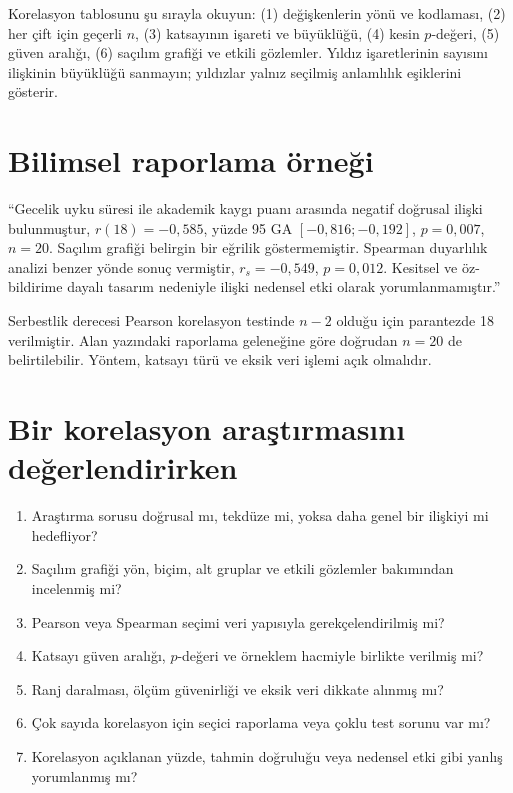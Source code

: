 \begin{outputguidebox}
Korelasyon tablosunu şu sırayla okuyun: (1) değişkenlerin yönü ve kodlaması,
(2) her çift için geçerli $n$, (3) katsayının işareti ve büyüklüğü, (4) kesin
$p$-değeri, (5) güven aralığı, (6) saçılım grafiği ve etkili gözlemler.
Yıldız işaretlerinin sayısını ilişkinin büyüklüğü sanmayın; yıldızlar yalnız
seçilmiş anlamlılık eşiklerini gösterir.
\end{outputguidebox}

\section{Bilimsel raporlama örneği}

``Gecelik uyku süresi ile akademik kaygı puanı arasında negatif doğrusal
ilişki bulunmuştur, $r(18)=-0{,}585$, yüzde 95 GA
$[-0{,}816;-0{,}192]$, $p=0{,}007$, $n=20$. Saçılım grafiği belirgin bir
eğrilik göstermemiştir. Spearman duyarlılık analizi benzer yönde sonuç
vermiştir, $r_s=-0{,}549$, $p=0{,}012$. Kesitsel ve öz-bildirime dayalı
tasarım nedeniyle ilişki nedensel etki olarak yorumlanmamıştır.''

Serbestlik derecesi Pearson korelasyon testinde $n-2$ olduğu için parantezde
18 verilmiştir. Alan yazındaki raporlama geleneğine göre doğrudan $n=20$ de
belirtilebilir. Yöntem, katsayı türü ve eksik veri işlemi açık olmalıdır.

\section{Bir korelasyon araştırmasını değerlendirirken}

\begin{enumerate}
  \item Araştırma sorusu doğrusal mı, tekdüze mi, yoksa daha genel bir ilişkiyi mi hedefliyor?
  \item Saçılım grafiği yön, biçim, alt gruplar ve etkili gözlemler bakımından incelenmiş mi?
  \item Pearson veya Spearman seçimi veri yapısıyla gerekçelendirilmiş mi?
  \item Katsayı güven aralığı, $p$-değeri ve örneklem hacmiyle birlikte verilmiş mi?
  \item Ranj daralması, ölçüm güvenirliği ve eksik veri dikkate alınmış mı?
  \item Çok sayıda korelasyon için seçici raporlama veya çoklu test sorunu var mı?
  \item Korelasyon açıklanan yüzde, tahmin doğruluğu veya nedensel etki gibi yanlış yorumlanmış mı?
\end{enumerate}

